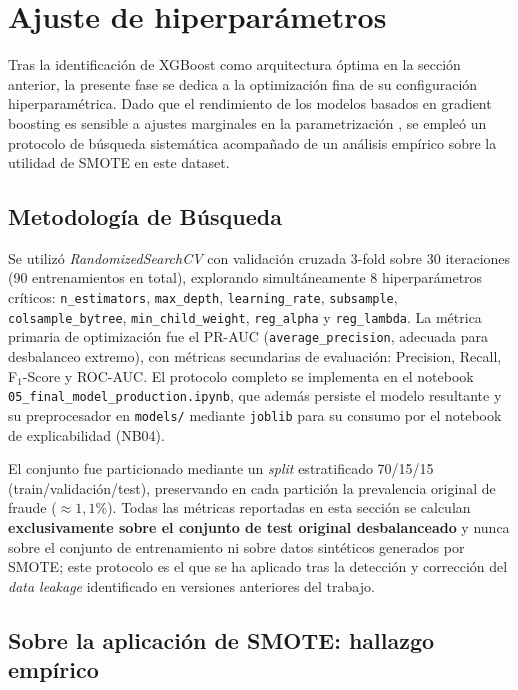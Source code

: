 \documentclass[12pt,a4paper]{report}
\begin{document}
\section{Ajuste de hiperparámetros}
\label{sec:h3_hiperparametros}

Tras la identificación de XGBoost como arquitectura óptima en la sección anterior, la presente fase se dedica a la optimización fina de su configuración hiperparamétrica. Dado que el rendimiento de los modelos basados en gradient boosting es sensible a ajustes marginales en la parametrización \cite{chen2016}, se empleó un protocolo de búsqueda sistemática acompañado de un análisis empírico sobre la utilidad de SMOTE en este dataset.

\subsection{Metodología de Búsqueda}

Se utilizó \textit{RandomizedSearchCV} con validación cruzada 3-fold sobre 30 iteraciones (90 entrenamientos en total), explorando simultáneamente 8 hiperparámetros críticos: \texttt{n\_estimators}, \texttt{max\_depth}, \texttt{learning\_rate}, \texttt{subsample}, \texttt{colsample\_bytree}, \texttt{min\_child\_weight}, \texttt{reg\_alpha} y \texttt{reg\_lambda}. La métrica primaria de optimización fue el PR-AUC (\texttt{average\_precision}, adecuada para desbalanceo extremo), con métricas secundarias de evaluación: Precision, Recall, F\(_1\)-Score y ROC-AUC. El protocolo completo se implementa en el notebook \texttt{05\_final\_model\_production.ipynb}, que además persiste el modelo resultante y su preprocesador en \texttt{models/} mediante \texttt{joblib} para su consumo por el notebook de explicabilidad (NB04).

El conjunto fue particionado mediante un \textit{split} estratificado 70/15/15 (train/validación/test), preservando en cada partición la prevalencia original de fraude ($\approx 1{,}1\%$). Todas las métricas reportadas en esta sección se calculan \textbf{exclusivamente sobre el conjunto de test original desbalanceado} y nunca sobre el conjunto de entrenamiento ni sobre datos sintéticos generados por SMOTE; este protocolo es el que se ha aplicado tras la detección y corrección del \textit{data leakage} identificado en versiones anteriores del trabajo.

\subsection*{Sobre la aplicación de SMOTE: hallazgo empírico}
\end{document}
